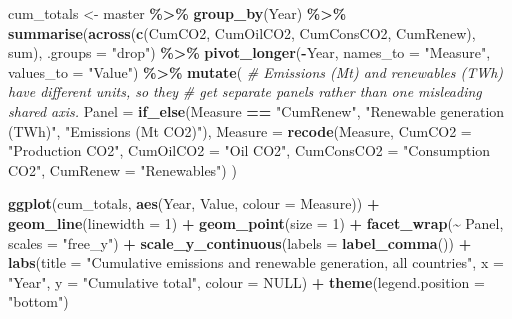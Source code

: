 \documentclass[
]{article}
\newenvironment{Shaded}{\begin{snugshade}}{\end{snugshade}}
\newcommand{\AttributeTok}[1]{\textcolor[rgb]{0.13,0.29,0.53}{#1}}
\newcommand{\CommentTok}[1]{\textcolor[rgb]{0.56,0.35,0.01}{\textit{#1}}}
\newcommand{\ConstantTok}[1]{\textcolor[rgb]{0.56,0.35,0.01}{#1}}
\newcommand{\DecValTok}[1]{\textcolor[rgb]{0.00,0.00,0.81}{#1}}
\newcommand{\FunctionTok}[1]{\textcolor[rgb]{0.13,0.29,0.53}{\textbf{#1}}}
\newcommand{\NormalTok}[1]{#1}
\newcommand{\OtherTok}[1]{\textcolor[rgb]{0.56,0.35,0.01}{#1}}
\newcommand{\SpecialCharTok}[1]{\textcolor[rgb]{0.81,0.36,0.00}{\textbf{#1}}}
\newcommand{\StringTok}[1]{\textcolor[rgb]{0.31,0.60,0.02}{#1}}
\begin{document}
\begin{Shaded}
\begin{Highlighting}[]
\NormalTok{cum\_totals }\OtherTok{\textless{}{-}}\NormalTok{ master }\SpecialCharTok{\%\textgreater{}\%}
  \FunctionTok{group\_by}\NormalTok{(Year) }\SpecialCharTok{\%\textgreater{}\%}
  \FunctionTok{summarise}\NormalTok{(}\FunctionTok{across}\NormalTok{(}\FunctionTok{c}\NormalTok{(CumCO2, CumOilCO2, CumConsCO2, CumRenew), sum),}
            \AttributeTok{.groups =} \StringTok{"drop"}\NormalTok{) }\SpecialCharTok{\%\textgreater{}\%}
  \FunctionTok{pivot\_longer}\NormalTok{(}\SpecialCharTok{{-}}\NormalTok{Year, }\AttributeTok{names\_to =} \StringTok{"Measure"}\NormalTok{, }\AttributeTok{values\_to =} \StringTok{"Value"}\NormalTok{) }\SpecialCharTok{\%\textgreater{}\%}
  \FunctionTok{mutate}\NormalTok{(}
    \CommentTok{\# Emissions (Mt) and renewables (TWh) have different units, so they}
    \CommentTok{\# get separate panels rather than one misleading shared axis.}
    \AttributeTok{Panel =} \FunctionTok{if\_else}\NormalTok{(Measure }\SpecialCharTok{==} \StringTok{"CumRenew"}\NormalTok{, }\StringTok{"Renewable generation (TWh)"}\NormalTok{,}
                    \StringTok{"Emissions (Mt CO2)"}\NormalTok{),}
    \AttributeTok{Measure =} \FunctionTok{recode}\NormalTok{(Measure, }\AttributeTok{CumCO2 =} \StringTok{"Production CO2"}\NormalTok{,}
                     \AttributeTok{CumOilCO2 =} \StringTok{"Oil CO2"}\NormalTok{,}
                     \AttributeTok{CumConsCO2 =} \StringTok{"Consumption CO2"}\NormalTok{,}
                     \AttributeTok{CumRenew =} \StringTok{"Renewables"}\NormalTok{)}
\NormalTok{  )}

\FunctionTok{ggplot}\NormalTok{(cum\_totals, }\FunctionTok{aes}\NormalTok{(Year, Value, }\AttributeTok{colour =}\NormalTok{ Measure)) }\SpecialCharTok{+}
  \FunctionTok{geom\_line}\NormalTok{(}\AttributeTok{linewidth =} \DecValTok{1}\NormalTok{) }\SpecialCharTok{+}
  \FunctionTok{geom\_point}\NormalTok{(}\AttributeTok{size =} \DecValTok{1}\NormalTok{) }\SpecialCharTok{+}
  \FunctionTok{facet\_wrap}\NormalTok{(}\SpecialCharTok{\textasciitilde{}}\NormalTok{ Panel, }\AttributeTok{scales =} \StringTok{"free\_y"}\NormalTok{) }\SpecialCharTok{+}
  \FunctionTok{scale\_y\_continuous}\NormalTok{(}\AttributeTok{labels =} \FunctionTok{label\_comma}\NormalTok{()) }\SpecialCharTok{+}
  \FunctionTok{labs}\NormalTok{(}\AttributeTok{title =} \StringTok{"Cumulative emissions and renewable generation, all countries"}\NormalTok{,}
       \AttributeTok{x =} \StringTok{"Year"}\NormalTok{, }\AttributeTok{y =} \StringTok{"Cumulative total"}\NormalTok{, }\AttributeTok{colour =} \ConstantTok{NULL}\NormalTok{) }\SpecialCharTok{+}
  \FunctionTok{theme}\NormalTok{(}\AttributeTok{legend.position =} \StringTok{"bottom"}\NormalTok{)}
\end{Highlighting}
\end{Shaded}
\end{document}
